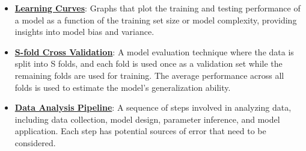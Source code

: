 \documentclass{article}%
\begin{document}
\begin{itemize}[leftmargin=*]
\item \href{https://www.math.purdue.edu/~yipn/351/10L1-CrossValidation.pdf#page=20}{\textbf{Learning Curves}}: Graphs that plot the training and testing performance of a model as a function of the training set size or model complexity, providing insights into model bias and variance.%
\item \href{https://www.math.purdue.edu/~yipn/351/10L1-CrossValidation.pdf#page=25}{\textbf{S{-}fold Cross Validation}}: A model evaluation technique where the data is split into S folds, and each fold is used once as a validation set while the remaining folds are used for training. The average performance across all folds is used to estimate the model's generalization ability.%
\item \href{https://www.math.purdue.edu/~yipn/351/10L1-CrossValidation.pdf#page=26}{\textbf{Data Analysis Pipeline}}: A sequence of steps involved in analyzing data, including data collection, model design, parameter inference, and model application. Each step has potential sources of error that need to be considered.%
\end{itemize}%
\end{document}
